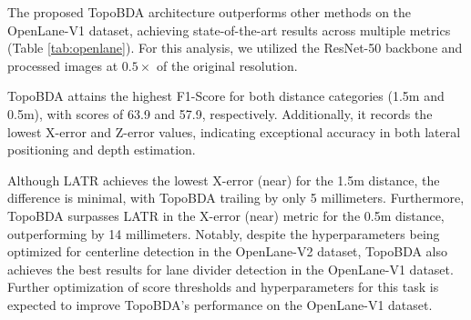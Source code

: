 The proposed TopoBDA architecture outperforms other methods on the OpenLane-V1 dataset, achieving state-of-the-art results across multiple metrics (Table \ref{tab:openlane}). For this analysis, we utilized the ResNet-50 backbone and processed images at $0.5\times$ of the original resolution.

TopoBDA attains the highest F1-Score for both distance categories (1.5m and 0.5m), with scores of 63.9 and 57.9, respectively. Additionally, it records the lowest X-error and Z-error values, indicating exceptional accuracy in both lateral positioning and depth estimation.

Although LATR achieves the lowest X-error (near) for the 1.5m distance, the difference is minimal, with TopoBDA trailing by only 5 millimeters. Furthermore, TopoBDA surpasses LATR in the X-error (near) metric for the 0.5m distance, outperforming by 14 millimeters. Notably, despite the hyperparameters being optimized for centerline detection in the OpenLane-V2 dataset, TopoBDA also achieves the best results for lane divider detection in the OpenLane-V1 dataset. Further optimization of score thresholds and hyperparameters for this task is expected to improve TopoBDA’s performance on the OpenLane-V1 dataset.


